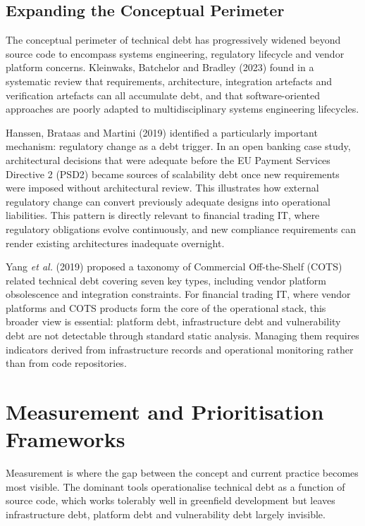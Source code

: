 \documentclass[
  12pt,
  letterpaper,
  12pt,
  oneside,
  english,
  onehalfspacing,
  headsepline]{MastersDoctoralThesis}
\begin{document}
\subsection{Expanding the Conceptual
Perimeter}\label{expanding-the-conceptual-perimeter}

The conceptual perimeter of technical debt has progressively widened
beyond source code to encompass systems engineering, regulatory
lifecycle and vendor platform concerns. Kleinwaks, Batchelor and Bradley
(2023) found in a systematic review that requirements, architecture,
integration artefacts and verification artefacts can all accumulate
debt, and that software-oriented approaches are poorly adapted to
multidisciplinary systems engineering lifecycles.

Hanssen, Brataas and Martini (2019) identified a particularly important
mechanism: regulatory change as a debt trigger. In an open banking case
study, architectural decisions that were adequate before the EU Payment
Services Directive 2 (PSD2) became sources of scalability debt once new
requirements were imposed without architectural review. This illustrates
how external regulatory change can convert previously adequate designs
into operational liabilities. This pattern is directly relevant to
financial trading IT, where regulatory obligations evolve continuously,
and new compliance requirements can render existing architectures
inadequate overnight.

Yang \emph{et al.} (2019) proposed a taxonomy of Commercial
Off-the-Shelf (COTS) related technical debt covering seven key types,
including vendor platform obsolescence and integration constraints. For
financial trading IT, where vendor platforms and COTS products form the
core of the operational stack, this broader view is essential: platform
debt, infrastructure debt and vulnerability debt are not detectable
through standard static analysis. Managing them requires indicators
derived from infrastructure records and operational monitoring rather
than from code repositories.

\section{Measurement and Prioritisation
Frameworks}\label{measurement-and-prioritisation-frameworks}

Measurement is where the gap between the concept and current practice
becomes most visible. The dominant tools operationalise technical debt
as a function of source code, which works tolerably well in greenfield
development but leaves infrastructure debt, platform debt and
vulnerability debt largely invisible.
\end{document}
